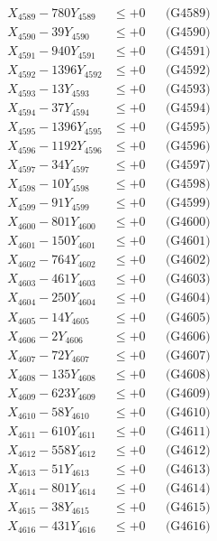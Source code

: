 \documentclass[a4paper,10pt]{article}
\begin{document}
{\begin{align}
X_{4589} - 780Y_{4589} &\leq +0 && \text{(G4589)} \\
X_{4590} - 39Y_{4590} &\leq +0 && \text{(G4590)} \\
\allowbreak
X_{4591} - 940Y_{4591} &\leq +0 && \text{(G4591)} \\
X_{4592} - 1396Y_{4592} &\leq +0 && \text{(G4592)} \\
X_{4593} - 13Y_{4593} &\leq +0 && \text{(G4593)} \\
X_{4594} - 37Y_{4594} &\leq +0 && \text{(G4594)} \\
X_{4595} - 1396Y_{4595} &\leq +0 && \text{(G4595)} \\
X_{4596} - 1192Y_{4596} &\leq +0 && \text{(G4596)} \\
X_{4597} - 34Y_{4597} &\leq +0 && \text{(G4597)} \\
X_{4598} - 10Y_{4598} &\leq +0 && \text{(G4598)} \\
X_{4599} - 91Y_{4599} &\leq +0 && \text{(G4599)} \\
X_{4600} - 801Y_{4600} &\leq +0 && \text{(G4600)} \\
\allowbreak
X_{4601} - 150Y_{4601} &\leq +0 && \text{(G4601)} \\
X_{4602} - 764Y_{4602} &\leq +0 && \text{(G4602)} \\
X_{4603} - 461Y_{4603} &\leq +0 && \text{(G4603)} \\
X_{4604} - 250Y_{4604} &\leq +0 && \text{(G4604)} \\
X_{4605} - 14Y_{4605} &\leq +0 && \text{(G4605)} \\
X_{4606} - 2Y_{4606} &\leq +0 && \text{(G4606)} \\
X_{4607} - 72Y_{4607} &\leq +0 && \text{(G4607)} \\
X_{4608} - 135Y_{4608} &\leq +0 && \text{(G4608)} \\
X_{4609} - 623Y_{4609} &\leq +0 && \text{(G4609)} \\
X_{4610} - 58Y_{4610} &\leq +0 && \text{(G4610)} \\
\allowbreak
X_{4611} - 610Y_{4611} &\leq +0 && \text{(G4611)} \\
X_{4612} - 558Y_{4612} &\leq +0 && \text{(G4612)} \\
X_{4613} - 51Y_{4613} &\leq +0 && \text{(G4613)} \\
X_{4614} - 801Y_{4614} &\leq +0 && \text{(G4614)} \\
X_{4615} - 38Y_{4615} &\leq +0 && \text{(G4615)} \\
X_{4616} - 431Y_{4616} &\leq +0 && \text{(G4616)} \\

\end{align}}
\end{document}
